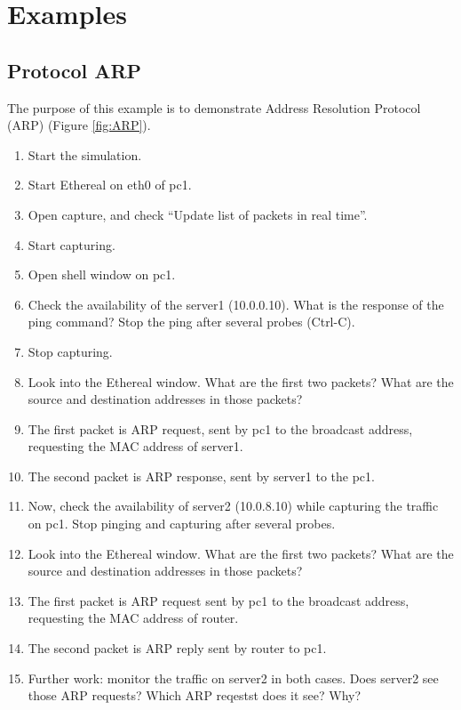 \section{Examples}
\subsection{Protocol ARP}

The purpose of this example is to demonstrate Address Resolution Protocol (ARP)
(Figure \ref{fig:ARP}).


\begin{enumerate}
\item	Start the simulation.
\item	Start Ethereal on eth0 of pc1. 
\item	Open capture, and check ``Update list of packets in real time''.
\item	Start capturing.
\item	Open shell window on pc1.
\item	Check the availability of the server1 (10.0.0.10). What is the response
of the ping command? Stop the ping after several probes (Ctrl-C). 
\item	Stop capturing.
\item	Look into the Ethereal window. What are the first two packets? What are
the source and destination addresses in those packets?
\item	The first packet is ARP request, sent by pc1 to the broadcast address,
requesting the MAC address of server1.
\item	The second packet is ARP response, sent by server1 to the pc1.
\item	Now, check the availability of server2 (10.0.8.10) while capturing the
traffic on pc1. Stop pinging and capturing after several probes.
\item	Look into the Ethereal window. What are the first two packets? What are
the source and destination addresses in those packets?
\item	The first packet is ARP request sent by pc1 to the broadcast address,
requesting the MAC address of router.
\item	The second packet is ARP reply sent by router to pc1. 
\item	Further work: monitor the traffic on server2 in both cases. Does
server2 see those ARP requests? Which ARP reqestst does it see? Why?
\end{enumerate}

